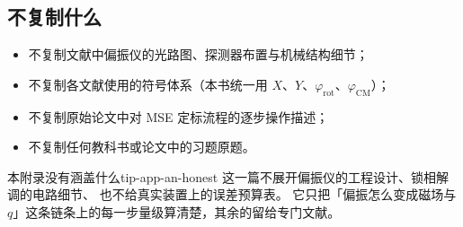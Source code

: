 \subsection*{不复制什么}

\begin{itemize}
\item 不复制文献中偏振仪的光路图、探测器布置与机械结构细节；
\item 不复制各文献使用的符号体系（本书统一用 $X$、$Y$、$\varphi_{\mathrm{rot}}$、$\varphi_{\mathrm{CM}}$）；
\item 不复制原始论文中对 MSE 定标流程的逐步操作描述；
\item 不复制任何教科书或论文中的习题原题。
\end{itemize}

\begin{tip}{本附录没有涵盖什么}{tip-app-an-honest}
这一篇不展开偏振仪的工程设计、锁相解调的电路细节、
也不给真实装置上的误差预算表。
它只把「偏振怎么变成磁场与 $q$」这条链条上的每一步量级算清楚，其余的留给专门文献。
\end{tip}
\endgroup

